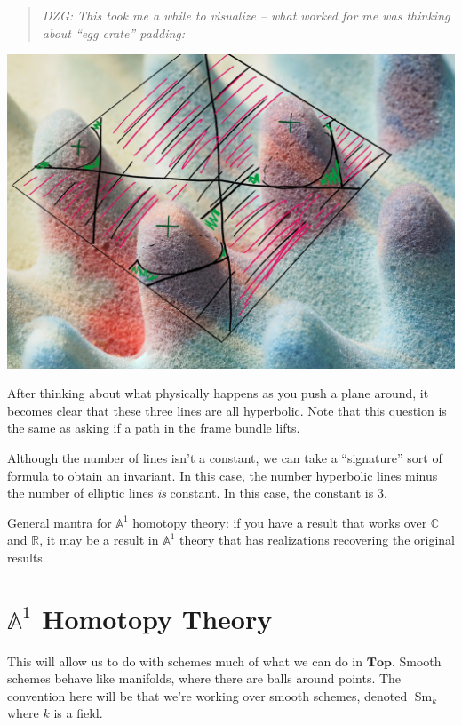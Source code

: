 \documentclass[11pt]{scrreprt}
\theoremstyle{definition}
\newcommand{\RR}[0]{{\mathbb{R}}}
\newcommand{\CC}[0]{{\mathbb{C}}}
\newcommand{\Af}[0]{{\mathbb{A}}}
\begin{document}
\begin{quote}
  \textit{DZG: This took me a while to visualize -- what worked for me was thinking
about ``egg crate'' padding:}
\end{quote}

\begin{center}
\includegraphics[scale=0.25]{../assets/2019-03-03-22-27-49.png}
\end{center}

After thinking about what physically happens as you push a plane around,
it becomes clear that these three lines are all hyperbolic. Note that
this question is the same as asking if a path in the frame bundle lifts.

Although the number of lines isn't a constant, we can take a
``signature'' sort of formula to obtain an invariant. In this case, the
number hyperbolic lines minus the number of elliptic lines \emph{is}
constant. In this case, the constant is 3.

General mantra for \(\Af^1\) homotopy theory: if you have a result that
works over \(\CC\) and \(\RR\), it may be a result in \(\Af^1\) theory
that has realizations recovering the original results.

\hypertarget{af1-homotopy-theory}{%
\section{\texorpdfstring{\(\Af^1\) Homotopy
Theory}{\textbackslash{}Af\^{}1 Homotopy Theory}}\label{af1-homotopy-theory}}

This will allow us to do with schemes much of what we can do in
\(\mathbf{Top}\). Smooth schemes behave like manifolds, where there are
balls around points. The convention here will be that we're working over
smooth schemes, denoted \(\operatorname{Sm}_k\) where \(k\) is a field.
\end{document}
